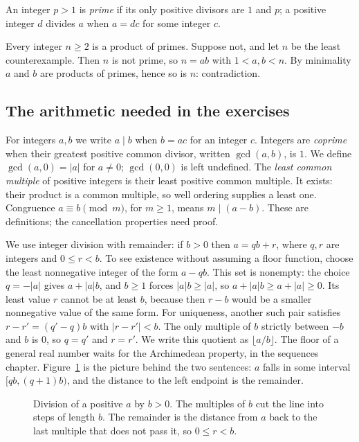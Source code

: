 An integer $p>1$ is \emph{prime} if its only positive divisors are $1$ and $p$; a positive integer $d$ divides $a$ when $a=dc$ for some integer $c$.

\begin{example}
Every integer $n\ge 2$ is a product of primes. Suppose not, and let $n$ be the least counterexample.
Then $n$ is not prime, so $n=ab$ with $1<a,b<n$. By minimality $a$ and $b$ are products of primes, hence
so is $n$: contradiction.
\end{example}

\subsection*{The arithmetic needed in the exercises}
For integers $a,b$ we write $a\mid b$ when $b=ac$ for an integer $c$. Integers are \emph{coprime} when their greatest positive common divisor, written $\gcd(a,b)$, is $1$. We define $\gcd(a,0)=|a|$ for $a\ne0$; $\gcd(0,0)$ is left undefined. The \emph{least common multiple} of positive integers is their least positive common multiple. It exists: their product is a common multiple, so well ordering supplies a least one. Congruence $a\equiv b\pmod m$, for $m\ge1$, means $m\mid(a-b)$. These are definitions; the cancellation properties need proof.

We use integer division with remainder: if $b>0$ then $a=qb+r$, where $q,r$ are integers and $0\le r<b$. To see existence without assuming a floor function, choose the least nonnegative integer of the form $a-qb$. This set is nonempty: the choice $q=-|a|$ gives $a+|a|b$, and $b\ge1$ forces $|a|b\ge|a|$, so $a+|a|b\ge a+|a|\ge0$. Its least value $r$ cannot be at least $b$, because then $r-b$ would be a smaller nonnegative value of the same form. For uniqueness, another such pair satisfies $r-r'=(q'-q)b$ with $|r-r'|<b$. The only multiple of $b$ strictly between $-b$ and $b$ is $0$, so $q=q'$ and $r=r'$. We write this quotient as $\lfloor a/b\rfloor$. The floor of a general real number waits for the Archimedean property, in the sequences chapter. Figure~\ref{fig:division} is the picture behind the two sentences: $a$ falls in some interval $[qb,(q+1)b)$, and the distance to the left endpoint is the remainder.

\begin{figure}[ht]
\centering
{}
\caption{Division of a positive $a$ by $b>0$. The multiples of $b$ cut the line into steps of length $b$. The remainder is the distance from $a$ back to the last multiple that does not pass it, so $0\le r<b$.}
\label{fig:division}
\end{figure}


